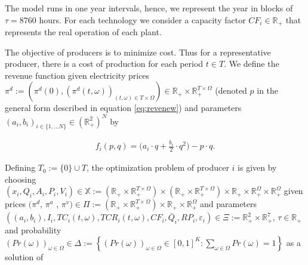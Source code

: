 \documentclass[11pt, letterpaper]{article}
\begin{document}
\smallskip
The model runs in one year intervals, hence, we represent the year in blocks of $\tau=8760$ hours. For each technology we consider a capacity factor $CF_i\in\mathbb{R}_+$ that represents the real operation of each plant.


The objective of producers is to minimize cost. Thus for a representative producer, there is a cost of production for each period $t\in T$. We define the revenue function given electricity prices $\pi^d:=\left(\pi^d(0),\left(\pi^d(t,\omega)\right)_{(t,\omega)\in T\times\Omega}\right)\in\mathbb{R}_+\times\mathbb{R}_+^{T\times\Omega}$ (denoted $p$ in the general form described in equation \ref{eq:revenew}) and parameters $(a_i,b_i)_{i\in\{1,...N\}}\in(\mathbb{R}^2_+)^N$ by

\begin{align}\label{eq:revenew}
f_i(p,q)=\Big(a_i\cdot q+\frac{b_i}{2}\cdot q^{2}\Big)-p\cdot q. 
\end{align}

Defining $T_0:=\{0\}\cup T$, the optimization problem of producer $i$ is given by choosing $(x_i,Q_i, A_i,P_i,V_i)\in\mathbb{X}:=(\mathbb{R}_+\times\mathbb{R}_+^{T\times\Omega}) \times(\mathbb{R}_+\times\mathbb{R}_+^{T\times\Omega}) \times \mathbb{R}_+\times\mathbb{R}_+^{\Omega}\times\mathbb{R}_+^{\Omega}$ given prices $(\pi^d$, $\pi^a$ , $\pi^v)\in\Pi:=(\mathbb{R}_+\times\mathbb{R}_+^{T\times\Omega})\times\mathbb{R}_+\times\mathbb{R}^{\Omega}_+$ and parameters $\left((a_i,b_i),I_i, TC_i(t,\omega), TCR_i(t,\omega), CF_i,\bar{Q}_i, RP_i , \varepsilon_i\right)\in \Xi:=\mathbb{R}_+^2\times\mathbb{R}_+^7$, $\tau\in \mathbb{R}_+$ and probability $(Pr(\omega))_{\omega\in\Omega}\in\Delta:=\left\{\left(Pr(\omega)\right)_{\omega\in\Omega}\in[0,1]^K:\sum_{\omega\in\Omega}Pr(\omega)=1\right\}$ as a solution of
\end{document}
